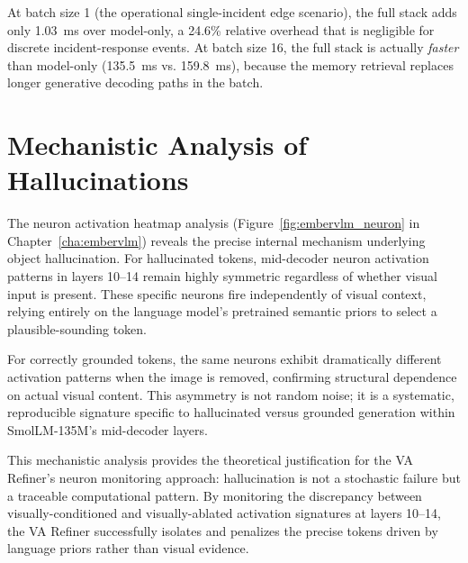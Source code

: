 At batch size 1 (the operational single-incident edge scenario), the full stack adds only 1.03~ms over model-only, a 24.6\% relative overhead that is negligible for discrete incident-response events. At batch size 16, the full stack is actually \emph{faster} than model-only (135.5~ms vs. 159.8~ms), because the memory retrieval replaces longer generative decoding paths in the batch.

\section{Mechanistic Analysis of Hallucinations}
\label{sec:exp_mechanistic}

The neuron activation heatmap analysis (Figure~\ref{fig:embervlm_neuron} in Chapter~\ref{cha:embervlm}) reveals the precise internal mechanism underlying object hallucination. For hallucinated tokens, mid-decoder neuron activation patterns in layers 10--14 remain highly symmetric regardless of whether visual input is present. These specific neurons fire independently of visual context, relying entirely on the language model's pretrained semantic priors to select a plausible-sounding token.

For correctly grounded tokens, the same neurons exhibit dramatically different activation patterns when the image is removed, confirming structural dependence on actual visual content. This asymmetry is not random noise; it is a systematic, reproducible signature specific to hallucinated versus grounded generation within SmolLM-135M's mid-decoder layers.

This mechanistic analysis provides the theoretical justification for the VA Refiner's neuron monitoring approach: hallucination is not a stochastic failure but a traceable computational pattern. By monitoring the discrepancy between visually-conditioned and visually-ablated activation signatures at layers 10--14, the VA Refiner successfully isolates and penalizes the precise tokens driven by language priors rather than visual evidence.

